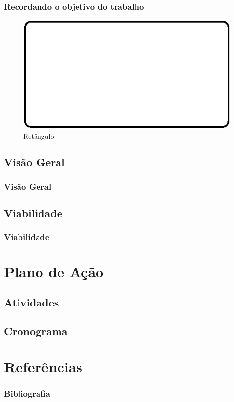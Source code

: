 \documentclass[hyperref={pdfpagelabels=false}]{beamer}
\begin{document}
\begin{frame}
	\frametitle{Recordando o objetivo do trabalho}
   
   	\begin{center}
   	\end{center}
   
    \begin{figure}[h]
    	\centering
	    \includegraphics[scale=0.6]{img/drawing.eps}
        \caption{Ret\^{a}ngulo}
    \end{figure}

\end{frame}

\subsection{Visão Geral}  

\begin{frame}
	\frametitle{Visão Geral}
   
\end{frame}
       
\subsection{Viabilidade}  

\begin{frame}
	\frametitle{Viabilidade}
   
\end{frame}

\section{Plano de Ação}

\subsection{Atividades}

\subsection{Cronograma}

\section {Referências}
\begin{frame}
\frametitle{Bibliografia}
    
    \small{  }
\end{frame}
\end{document}

